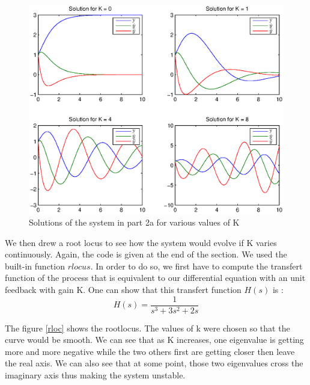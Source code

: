 \begin{figure}
\begin{center}
\includegraphics[scale=0.5]{result21.eps}
\caption{Solutions of the system in part 2a for various values of K}
\label{result21}
\end{center}
\end{figure}

We then drew a root locus to see how the system would evolve if K varies continuously. Again, the code is given at the end of the section. We used the built-in function $rlocus$. In order to do so, we first have to compute the transfert function of the process that is equivalent to our differential equation with an unit feedback with gain K. One can show that this transfert function $H(s)$ is :
$$H(s) = \frac{1}{s^3+3s^2+2s}$$

The figure \ref{rloc} shows the rootlocus. The values of k were chosen so that the curve would be smooth. We can see that as K increases, one eigenvalue is getting more and more negative while the two others first are getting closer then leave the real axis. We can also see that at some point, those two eigenvalues cross the imaginary axis thus making the system unstable.

